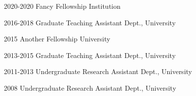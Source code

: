 

\begin{cvskills}

  \cvskill
    {2020-2020} %
    {Fancy Fellowship} %
    {Institution} %

  \cvskill
    {2016-2018} %
    {Graduate Teaching Assistant} %
    {Dept., University} %

  \cvskill
    {2015} %
    {Another Fellowship} %
    {University} %

  \cvskill
    {2013-2015} %
    {Graduate Teaching Assistant} %
    {Dept., University} %

  \cvskill
    {2011-2013} %
    {Undergraduate Research Assistant} %
    {Dept., University} %

  \cvskill
    {2008} %
    {Undergraduate Research Assistant} %
    {Dept., University} %

\end{cvskills}
